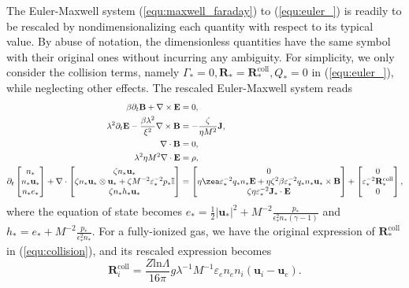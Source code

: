 \documentclass{report}
\begin{document}
The Euler-Maxwell system (\ref{equ:maxwell_faraday}) to (\ref{equ:euler_}) is readily to be rescaled by nondimensionalizing each quantity with respect to its typical value. By abuse of notation, the dimensionless quantities have the same symbol with their original ones without incurring any ambiguity. For simplicity, we only consider the collision terms, namely $\Gamma_* = 0, \mathbf{R}_* = \mathbf{R}_*^\text{coll}, Q_* = 0$ in (\ref{equ:euler_}), while neglecting other effects. The rescaled Euler-Maxwell system reads
\begin{align}
    \beta \partial_t \mathbf{B} + \nabla \times \mathbf{E} &= 0, \label{equ:maxwell_faraday_rescalling} \\ 
    \lambda^2 \partial_t \mathbf{E} - \frac{\beta \lambda^2}{\xi^2}\nabla \times \mathbf{B} &= - \frac{\zeta}{\eta M^2}\mathbf{J}, \label{equ:maxwell_ampere_rescalling} \\
    \nabla \cdot \mathbf{B} &= 0,  \label{equ:maxwell_gauss_B_rescalling}\\
    \lambda^2 \eta M^2 \nabla \cdot \mathbf{E} &= \rho, \label{equ:maxwell_gauss_D_rescalling} \\
    \partial_t
    \begin{bmatrix}
    n_* \\
    n_* \mathbf{u}_* \\
    n_* e_*
    \end{bmatrix}
    + \nabla \cdot
    \begin{bmatrix}
    \zeta n_* \mathbf{u}_* \\
    \zeta n_* \mathbf{u}_* \otimes \mathbf{u}_* + \zeta M^{-2} \varepsilon_*^{-2} p_*\mathbb{I} \\
    \zeta n_* h_* \mathbf{u}_*
    \end{bmatrix}
    &=
    \begin{bmatrix}
    0 \\
    \eta \zea \varepsilon_*^{-2} q_* n_*\mathbf{E} + \eta \zeta^2 \beta \varepsilon_*^{-2} q_* n_* \mathbf{u}_* \times \mathbf{B} \\
    \zeta \eta \varepsilon_*^{-2} \mathbf{J}_* \cdot \mathbf{E}
    \end{bmatrix} +
    \begin{bmatrix}
    0 \\
    \varepsilon_*^{-2}\mathbf{R}_*^{\text{coll}} \\
    0 
    \end{bmatrix}, \label{equ:euler_rescalling}
\end{align}
where the equation of state becomes $e_* = \frac{1}{2}|\mathbf{u_*}|^2 + M^{-2}\frac{p_*}{\epsilon^2_* n_* (\gamma - 1)}$ and $h_* = e_* + M^{-2}\frac{p_*}{\epsilon^2_* n_*}$. For a fully-ionized gas, we have the original expression of $\mathbf{R}_*^{\text{coll}}$ in (\ref{equ:collision}), and its rescaled expression becomes
\begin{equation*}
    \mathbf{R}_i^{\text{coll}} = \frac{Z\text{ln}\Lambda}{16\pi}g\lambda^{-1}M^{-1}\varepsilon_en_en_i(\mathbf{u}_i - \mathbf{u}_e). 
\end{equation*}
\end{document}
